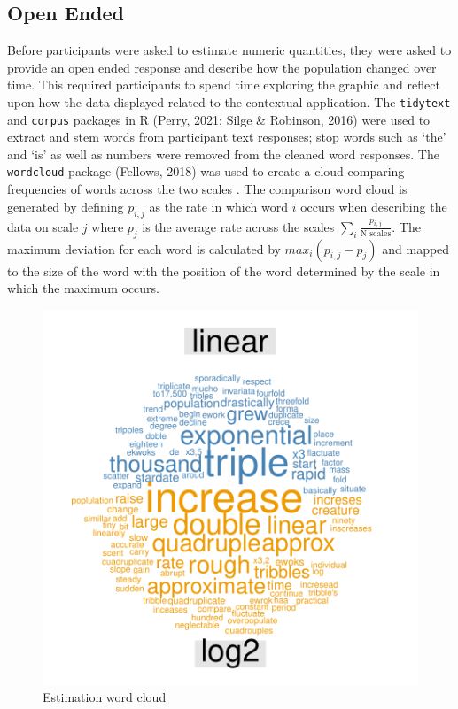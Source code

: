 \documentclass[print]{nuthesis}
\begin{document}
\hypertarget{open-ended}{%
\subsection{Open Ended}\label{open-ended}}

Before participants were asked to estimate numeric quantities, they were asked to provide an open ended response and describe how the population changed over time.
This required participants to spend time exploring the graphic and reflect upon how the data displayed related to the contextual application.
The \texttt{tidytext} and \texttt{corpus} packages in R (Perry, 2021; Silge \& Robinson, 2016) were used to extract and stem words from participant text responses; stop words such as `the' and `is' as well as numbers were removed from the cleaned word responses. 
The \texttt{wordcloud} package (Fellows, 2018) was used to create a cloud comparing frequencies of words across the two scales .
The comparison word cloud is generated by defining \(p_{i,j}\) as the rate in which word \(i\) occurs when describing the data on scale \(j\) where \(p_j\) is the average rate across the scales \(\sum_i{\frac{p_{i,j}}{\text{N scales}}}\).
The maximum deviation for each word is calculated by \(max_i(p_{i,j} - p_j)\) and mapped to the size of the word with the position of the word determined by the scale in which the maximum occurs.

\begin{figure}[tbp]

{\centering \includegraphics[width=0.75\linewidth,]{thesis_files/figure-latex/estimation-word-cloud-1} 

}

\caption{Estimation word cloud}\label{fig:estimation-word-cloud}
\end{figure}
\end{document}
